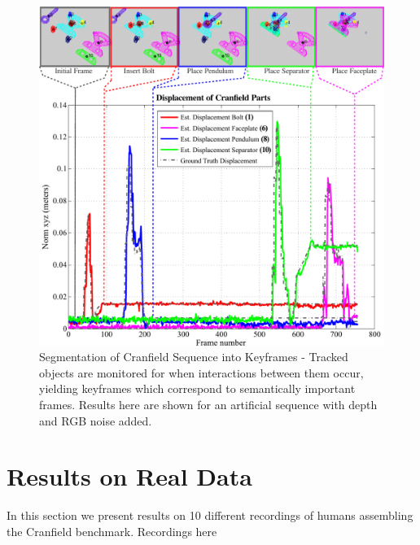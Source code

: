 \begin{figure}[!ht]
  \centering
  \includegraphics[width=\linewidth]{figures/Tracking/Action_Segmentation.pdf}
  \caption[Segmentation of Actions]{Segmentation of Cranfield Sequence into Keyframes - Tracked objects are monitored for when interactions between them occur, yielding keyframes which correspond to semantically important frames. Results here are shown for an artificial sequence with depth and RGB noise added.}
  \label{fig:ActionSegmentation}
\end{figure}

\section{Results on Real Data}
In this section we present results on 10 different recordings of humans assembling the Cranfield benchmark. Recordings here 

